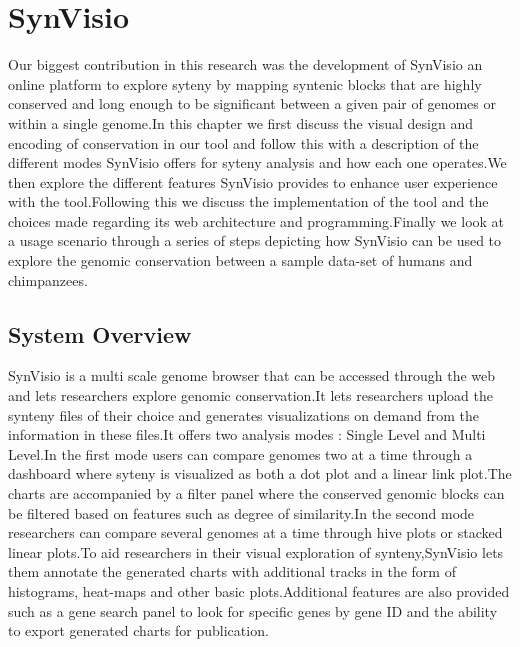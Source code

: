 \chapter{SynVisio}

Our biggest contribution in this research was the development of SynVisio an online platform to explore syteny by mapping syntenic blocks that are highly conserved and long enough to be significant between a given pair of genomes or within a single genome.In this chapter we first discuss the visual design and encoding of conservation in our tool and follow this with a description of the different modes SynVisio offers for syteny analysis and how each one operates.We then explore the different features SynVisio provides to enhance user experience with the tool.Following this we discuss the implementation of the tool and the choices made regarding its web architecture and programming.Finally we look at a  usage scenario through a series of steps depicting how SynVisio can be used to explore the genomic conservation between a sample data-set of humans and chimpanzees.

\section{System Overview}
SynVisio is a multi scale genome browser that can be accessed through the web and lets researchers explore genomic conservation.It lets researchers upload the synteny files of their choice and generates visualizations on demand from the information in these files.It offers two analysis modes : Single Level and Multi Level.In the first mode users can compare genomes two at a time through a dashboard where syteny is visualized as both a dot plot and a linear link plot.The charts are accompanied by a filter panel where the conserved genomic blocks can be filtered based on features such as degree of similarity.In the second mode researchers can compare several genomes at a time through hive plots or stacked linear plots.To aid researchers in their visual exploration of synteny,SynVisio lets them annotate the generated charts with additional tracks in the form of histograms, heat-maps and other basic plots.Additional features are also provided such as a gene search panel to look for specific genes by gene ID and the ability to export generated charts for publication.


